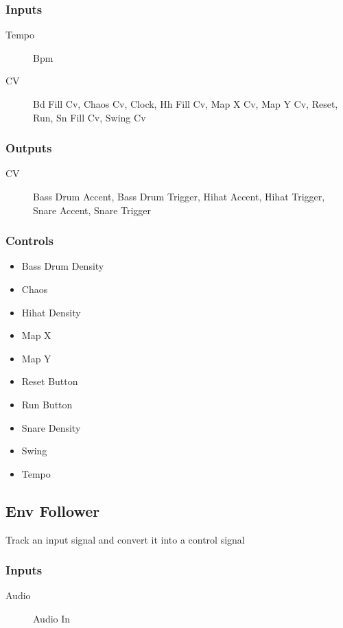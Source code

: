 \subsubsection{Inputs}
\begin{description}
\item [Tempo] Bpm
\item [CV] Bd Fill Cv, Chaos Cv, Clock, Hh Fill Cv, Map X Cv, Map Y Cv, Reset, Run, Sn Fill Cv, Swing Cv
\end{description}

\subsubsection{Outputs}
\begin{description}
\item [CV] Bass Drum Accent, Bass Drum Trigger, Hihat Accent, Hihat Trigger, Snare Accent, Snare Trigger
\end{description}

\subsubsection{Controls}
\begin{itemize}
\item Bass Drum Density
\item Chaos
\item Hihat Density
\item Map X
\item Map Y
\item Reset Button
\item Run Button
\item Snare Density
\item Swing
\item Tempo
\end{itemize}

\subsection{Env Follower}

Track an input signal and convert it into a control signal



\subsubsection{Inputs}
\begin{description}
\item [Audio] Audio In
\end{description}

